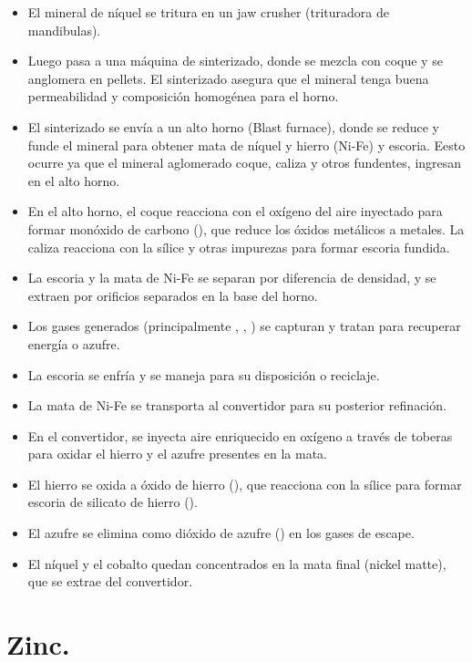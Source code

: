 \documentclass[12pt,a4paper]{article}
\begin{document}
\begin{itemize}
    \item El mineral de níquel se tritura en un jaw crusher (trituradora de mandibulas).
    \item Luego pasa a una máquina de sinterizado, donde se mezcla con coque y se anglomera en \textacutedbl{}pellets\textacutedbl{}. El sinterizado asegura que el mineral tenga buena permeabilidad y composición homogénea para el horno.
    \item El sinterizado se envía a un alto horno (Blast furnace), donde se reduce y funde el mineral para obtener mata de níquel y hierro (Ni-Fe) y escoria. Eesto ocurre ya que el mineral aglomerado coque, caliza y otros fundentes, ingresan en el alto horno.
    \item En el alto horno, el coque reacciona con el oxígeno del aire inyectado para formar monóxido de carbono (), que reduce los óxidos metálicos a metales. La caliza reacciona con la sílice y otras impurezas para formar escoria fundida.
    \item La escoria y la mata de Ni-Fe se separan por diferencia de densidad, y se extraen por orificios separados en la base del horno.
    \item Los gases generados (principalmente , , ) se capturan y tratan para recuperar energía o azufre.
    \item La escoria se enfría y se maneja para su disposición o reciclaje.
    \item La mata de Ni-Fe se transporta al convertidor para su posterior refinación.
    \item En el convertidor, se inyecta aire enriquecido en oxígeno a través de toberas para oxidar el hierro y el azufre presentes en la mata.
    \item El hierro se oxida a óxido de hierro (), que reacciona con la sílice para formar escoria de silicato de hierro ().
    \item El azufre se elimina como dióxido de azufre () en los gases de escape.
    \item El níquel y el cobalto quedan concentrados en la mata final (nickel matte), que se extrae del convertidor.
\end{itemize}

\section{Zinc.}
\end{document}
